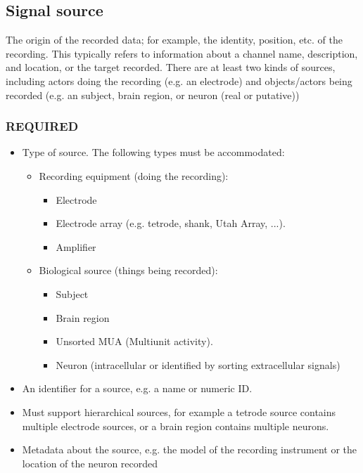 \documentclass[letterpaper, 10 pt, conference]{ieeeconf}  \IEEEoverridecommandlockouts                              \overrideIEEEmargins
\begin{document}
\subsection{Signal source}
The origin of the recorded data; for example, the identity, position, etc. of the recording. This typically refers to information about a channel name, description, and location, or the target recorded.  There are at least two kinds of sources, including actors doing the recording (e.g. an electrode) and objects/actors being recorded (e.g. an subject, brain region, or neuron (real or putative))
\smallskip
\subsubsection*{REQUIRED}
\begin{itemize}
\item Type of source.  The following types must be accommodated:
 \begin{itemize}
 \item Recording equipment (doing the recording):
  \begin{itemize}
  \item Electrode
  \item Electrode array (e.g. tetrode, shank, Utah Array, ...).
  \item Amplifier
  \end{itemize}
 \item Biological source (things being recorded):
  \begin{itemize}
  \item Subject
  \item Brain region
  \item Unsorted MUA (Multiunit activity).
  \item Neuron (intracellular or identified by sorting extracellular signals)
  \end{itemize}
 \end{itemize}
\item An identifier for a source, e.g. a name or numeric ID.
\item Must support hierarchical sources, for example a tetrode source contains multiple electrode sources, or a brain region contains multiple neurons.  
\item Metadata about the source, e.g. the model of the recording instrument or the location of the neuron recorded
\end{itemize}
\smallskip
\end{document}

